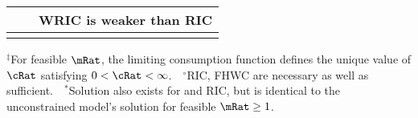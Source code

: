\begin{table}
{\begin{tabular}{|l|l|l|}
\\                                          &                                 & WRIC is weaker than RIC
\\ \hline \multicolumn{3}{c}{}
\end{tabular}
} %

\settowidth\TableWidth{\usebox{\Required}}
\usebox{\Required}

\parbox{\TableWidth}{\footnotesize         $^{\ddagger}$For feasible $\mRat$, the limiting consumption function defines the unique value of $\cRat$ satisfying $0 < \cRat < \infty$.~~$^{\circ}$RIC, FHWC are necessary as well as sufficient.~~$^{\ast}$Solution also exists for  and RIC, but is identical to the unconstrained model's solution for feasible $\mRat \geq 1$.}

\end{table}

